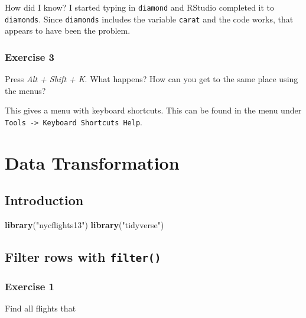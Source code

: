 \documentclass[]{book}
\newenvironment{Shaded}{\begin{snugshade}}{\end{snugshade}}
\newcommand{\KeywordTok}[1]{\textcolor[rgb]{0.13,0.29,0.53}{\textbf{#1}}}
\newcommand{\NormalTok}[1]{#1}
\newcommand{\StringTok}[1]{\textcolor[rgb]{0.31,0.60,0.02}{#1}}
\theoremstyle{plain}
\theoremstyle{remark}
\theoremstyle{definition}
\theoremstyle{definition}
\theoremstyle{definition}
\theoremstyle{remark}
\begin{document}
How did I know? I started typing in \texttt{diamond} and RStudio
completed it to \texttt{diamonds}. Since \texttt{diamonds} includes the
variable \texttt{carat} and the code works, that appears to have been
the problem.

\hypertarget{exercise-3-4}{%
\subsection{Exercise 3}\label{exercise-3-4}}

Press \emph{Alt + Shift + K}. What happens? How can you get to the same
place using the menus?

This gives a menu with keyboard shortcuts. This can be found in the menu
under \texttt{Tools\ -\textgreater{}\ Keyboard\ Shortcuts\ Help}.

\hypertarget{data-transformation}{%
\chapter{Data Transformation}\label{data-transformation}}

\hypertarget{introduction-2}{%
\section{Introduction}\label{introduction-2}}

\begin{Shaded}
\begin{Highlighting}[]
\KeywordTok{library}\NormalTok{(}\StringTok{"nycflights13"}\NormalTok{)}
\KeywordTok{library}\NormalTok{(}\StringTok{"tidyverse"}\NormalTok{)}
\end{Highlighting}
\end{Shaded}

\hypertarget{filter-rows-with-filter}{%
\section{\texorpdfstring{Filter rows with
\texttt{filter()}}{Filter rows with filter()}}\label{filter-rows-with-filter}}

\hypertarget{exercise-1-6}{%
\subsection{Exercise 1}\label{exercise-1-6}}

Find all flights that
\end{document}
